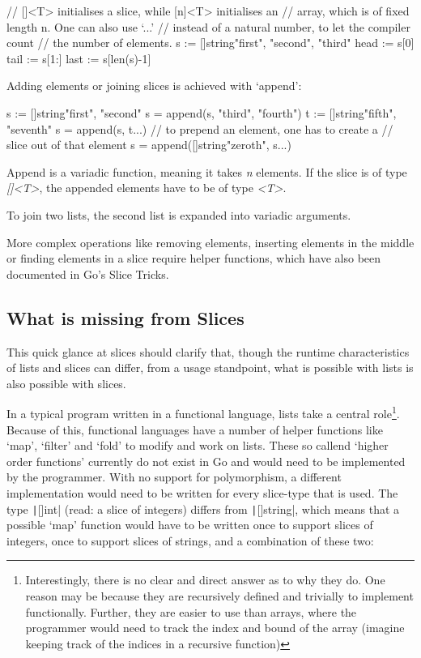 \begin{gocode}
// []<T> initialises a slice, while [n]<T> initialises an
// array, which is of fixed length n. One can also use `...'
// instead of a natural number, to let the compiler count
// the number of elements.
s := []string{"first", "second", "third"}
head := s[0]
tail := s[1:]
last := s[len(s)-1]
\end{gocode}

Adding elements or joining slices is achieved with `append':

\begin{gocode}
s := []string{"first", "second"}
s = append(s, "third", "fourth")
t := []string{"fifth", "seventh"}
s = append(s, t...)
// to prepend an element, one has to create a
// slice out of that element
s = append([]string{"zeroth"}, s...)
\end{gocode}

Append is a variadic function, meaning it takes \textit{n} elements. If the slice is of type \textit{[]<T>},
the appended elements have to be of type \textit{<T>}.

To join two lists, the second list is expanded into
variadic arguments.

More complex operations like removing elements, inserting elements in the middle or finding
elements in a slice require helper functions, which have also been documented in Go's
Slice Tricks\autocite{slice-tricks}.

\subsection{What is missing from Slices}

This quick glance at slices should clarify that, though the runtime characteristics of lists and slices
can differ, from a usage standpoint, what is possible with lists is also possible with slices.

In a typical program written in a functional language, lists take a central role\footnote{Interestingly,
	there is no clear and direct answer as to why they do. One reason may be because they are recursively
	defined and trivially to implement functionally. Further, they are easier to use than arrays, where
	the programmer would need to track the index and bound of the array (imagine keeping track of the
indices in a recursive function)\autocite{why-lists}}. Because of this, functional languages have
a number of helper functions like `map', `filter' and `fold'\autocite{haskell-list-funcs} to modify and
work on lists. These so callend `higher order functions' currently do
not exist in Go and would need to be implemented by the programmer. With no support for polymorphism, a
different implementation would need to be written for every slice-type that is used. The type \texttt|[]int|
(read: a slice of integers) differs from \texttt|[]string|, which means that a possible
`map' function would have to be written once to support slices of integers, once to support slices
of strings, and a combination of these two:

